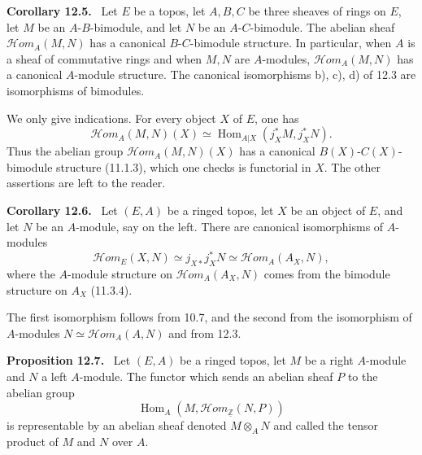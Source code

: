 \documentclass[11pt]{article}
\newcommand{\ZZ}{\mathbb{Z}}
\newcommand{\Hom}{\operatorname{Hom}}
\newcommand{\scrHom}{\mathscr{H}\!om}
\newenvironment{statement}[1]{\par\medskip\noindent\textbf{#1.}\ }{\par\medskip}
\begin{document}
\begin{statement}{Corollary 12.5}
Let $E$ be a topos, let $A,B,C$ be three sheaves of rings on $E$, let $M$ be an $A$-$B$-bimodule, and let $N$ be an $A$-$C$-bimodule. The abelian sheaf $\scrHom_A(M,N)$ has a canonical $B$-$C$-bimodule structure. In particular, when $A$ is a sheaf of commutative rings and when $M,N$ are $A$-modules, $\scrHom_A(M,N)$ has a canonical $A$-module structure. The canonical isomorphisms b), c), d) of 12.3 are isomorphisms of bimodules.
\end{statement}

We only give indications. For every object $X$ of $E$, one has
\[
\scrHom_A(M,N)(X)\simeq \Hom_{A|X}(j_X^*M,j_X^*N).
\]
Thus the abelian group $\scrHom_A(M,N)(X)$ has a canonical $B(X)$-$C(X)$-bimodule structure (11.1.3), which one checks is functorial in $X$. The other assertions are left to the reader.

\begin{statement}{Corollary 12.6}
Let $(E,A)$ be a ringed topos, let $X$ be an object of $E$, and let $N$ be an $A$-module, say on the left. There are canonical isomorphisms of $A$-modules
\[
\scrHom_E(X,N)\simeq j_{X*}j_X^*N\simeq \scrHom_A(A_X,N),
\]
where the $A$-module structure on $\scrHom_A(A_X,N)$ comes from the bimodule structure on $A_X$ (11.3.4).
\end{statement}

The first isomorphism follows from 10.7, and the second from the isomorphism of $A$-modules $N\simeq \scrHom_A(A,N)$ and from 12.3.

\begin{statement}{Proposition 12.7}
Let $(E,A)$ be a ringed topos, let $M$ be a right $A$-module and $N$ a left $A$-module. The functor which sends an abelian sheaf $P$ to the abelian group
\[
\Hom_A(M,\scrHom_{\underline{\ZZ}}(N,P))
\]
is representable by an abelian sheaf denoted $M\otimes_A N$ and called the tensor product of $M$ and $N$ over $A$.
\end{statement}
\end{document}

